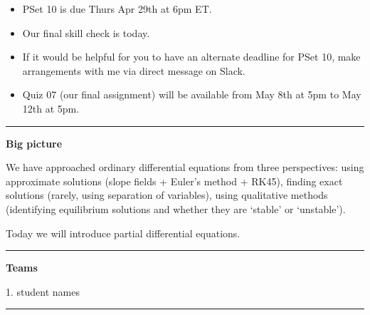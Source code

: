 \documentclass[12pt,letterpaper,noanswers]{exam}
\begin{document}
 \pdfpageheight 11in 
  \pdfpagewidth 8.5in





\begin{itemize}
\itemsep0em
\item PSet 10 is due Thurs Apr 29th at 6pm ET.
\item Our final skill check is today.
\item If it would be helpful for you to have an alternate deadline for PSet 10, make arrangements with me via direct message on Slack.
\item Quiz 07 (our final assignment) will be available from May 8th at 5pm to May 12th at 5pm.
\end{itemize}

\hrule
\vspace{0.2cm}


\noindent\textbf{Big picture}

We have approached ordinary differential equations from three perspectives: using approximate solutions (slope fields + Euler's method + RK45), finding exact solutions (rarely, using separation of variables), using qualitative methods (identifying equilibrium solutions and whether they are `stable' or `unstable').

Today we will introduce partial differential equations.

\vspace{0.2cm}
\hrule
\vspace{0.2cm}

\noindent\textbf{Teams}

\begin{multicols}{2}

1.  student names
\end{multicols}

\vspace{0.2cm}
\hrule
\vspace{0.2cm}
\end{document}
